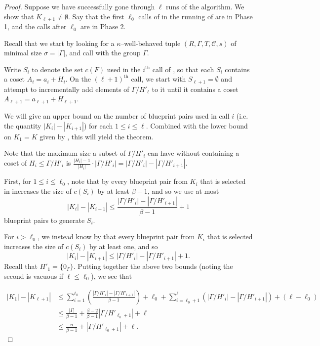 \documentclass{article}
\newcommand{\cC}{\mathcal{C} }
\theoremstyle{definition}
\begin{document}
\begin{proof}
Suppose we have successfully gone through $\ell$ runs of the algorithm. We show that $K_{\ell+1}\neq\emptyset$. Say that the first $\ell_0$ calls of  in the running of  are in Phase 1, and the calls after $\ell_0$ are in Phase 2.

Recall that we start by looking for a $\kappa$--well-behaved tuple $(R,\Gamma,T,\cC,s)$ of minimal size $\sigma=|\Gamma|$, and call  with the group $\Gamma$. 

Write $S_{i}$ to denote the set $c(F)$ used in the $i^\text{th}$ call of , so that each $S_i$ contains a coset $A_i=a_i+H_i$. On the $(\ell+1)^\text{th}$ call, we start with $S_{\ell+1}=\emptyset$ and attempt to incrementally add elements of $\Gamma/H'_{\ell}$ to it until it contains a coset $A_{\ell+1}=a_{\ell+1}+H_{\ell+1}$.

We will give an upper bound on the number of blueprint pairs used in call $i$ (i.e. the quantity $|K_i|-|K_{i+1}|$) for each $1\leq i \leq \ell$. Combined with the lower bound on $K_1=K$ given by , this will yield the theorem. 

Note that the maximum size a subset of $\Gamma/H'_i$ can have without containing a coset of $H_i\leqslant \Gamma/H'_i$ is $\frac{|H_i|-1}{|H_i|} \cdot |\Gamma/H'_i|=|\Gamma/H'_{i}|-|\Gamma/H'_{i+1}|$. 

First, for $1\leq i\leq \ell_0$, note that by  every blueprint pair from $K_i$ that is selected in  increases the size of $c(S_i)$ by at least $\beta-1$, and so we use at most
\[|K_i|-|K_{i+1}|\leq \frac{|\Gamma/H'_{i}|-|\Gamma/H'_{i+1}|}{\beta-1}+1\] 
blueprint pairs to generate $S_i$.

For $i>\ell_0$, we instead know by  that every blueprint pair from $K_i$ that is selected increases the size of $c(S_i)$ by at least one, and so
\[|K_i|-|K_{i+1}|\leq |\Gamma/H'_{i}|-|\Gamma/H'_{i+1}|+1.\]
Recall that $H'_1=\{0_\Gamma\}$. Putting together the above two bounds (noting the second is vacuous if $\ell\le\ell_0$), we see that

\begin{align*}
\label{equ:gadgetcounts}|K_1|-|K_{\ell+1}|&\leq \sum_{i=1}^{\ell_0}\left(\frac{|\Gamma/H'_{i}|-|\Gamma/H'_{i+1}|}{\beta-1}\right)+\ell_0+\sum_{i=\ell_0+1}^{\ell}\left(|\Gamma/H'_{i}|-|\Gamma/H'_{i+1}|\right)+(\ell-\ell_0) \\ &\leq \frac{|\Gamma|}{\beta-1} + \frac{\beta-2}{\beta-1}|\Gamma/H'_{\ell_0+1}|+\ell \\
&\leq \frac{n}{\beta-1}+|\Gamma/H'_{\ell_0+1}| +\ell.
\tag{$**$}
\end{align*}


\end{proof}
\end{document}

